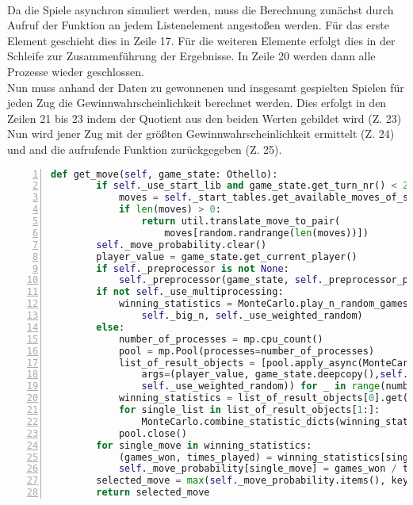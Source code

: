 \\Da die Spiele asynchron simuliert werden, muss die Berechnung zunächst durch Aufruf der Funktion  an jedem Listenelement angestoßen werden. Für das erste Element geschieht dies in Zeile 17. Für die weiteren Elemente erfolgt dies in der Schleife zur Zusammenführung der Ergebnisse. In Zeile 20 werden dann alle Prozesse wieder geschlossen.
\\Nun muss anhand der Daten zu gewonnenen und insgesamt gespielten Spielen für jeden Zug die Gewinnwahrscheinlichkeit berechnet werden. Dies erfolgt in den Zeilen 21 bis 23 indem der Quotient aus den beiden Werten gebildet wird (Z. 23)
 \\Nun wird jener Zug mit der größten Gewinnwahrscheinlichkeit ermittelt (Z. 24) und and die aufrufende Funktion zurückgegeben (Z. 25).      
 \newpage
\begin{lstlisting}[basicstyle=\footnotesize,caption = {get\_move Funktion des \mc\ Agenten}, language = python, captionpos = t , numbers=left, label={lst:getmovemc}]
    def get_move(self, game_state: Othello):
        if self._use_start_lib and game_state.get_turn_nr() < 21:
            moves = self._start_tables.get_available_moves_of_start_tables(game_state)
            if len(moves) > 0:
                return util.translate_move_to_pair(
                    moves[random.randrange(len(moves))])
        self._move_probability.clear()
        player_value = game_state.get_current_player()
        if self._preprocessor is not None:
            self._preprocessor(game_state, self._preprocessor_parameter, self._heuristic)
        if not self._use_multiprocessing:
            winning_statistics = MonteCarlo.play_n_random_games(player_value, game_state,
                self._big_n, self._use_weighted_random)
        else:
            number_of_processes = mp.cpu_count()
            pool = mp.Pool(processes=number_of_processes)
            list_of_result_objects = [pool.apply_async(MonteCarlo.play_n_random_games,
                args=(player_value, game_state.deepcopy(),self._big_n // number_of_processes,
                self._use_weighted_random)) for _ in range(number_of_processes)]
            winning_statistics = list_of_result_objects[0].get()
            for single_list in list_of_result_objects[1:]:
                MonteCarlo.combine_statistic_dicts(winning_statistics, single_list.get())
            pool.close()
        for single_move in winning_statistics:
            (games_won, times_played) = winning_statistics[single_move]
            self._move_probability[single_move] = games_won / times_played
        selected_move = max(self._move_probability.items(), key=operator.itemgetter(1))[0]
        return selected_move
\end{lstlisting}

